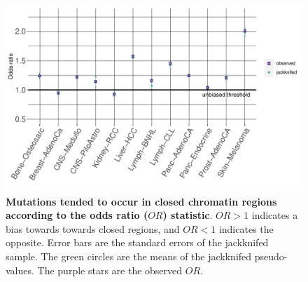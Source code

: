 \begin{figure}[ht!]
    \centering
    \includegraphics[scale=0.75]{graphics/jackknife_OR.pdf}
    \caption{\textbf{Mutations tended to occur in closed chromatin regions according to the odds ratio ($OR$) statistic}. $OR>1$ indicates a bias towards towards closed regions, and $OR<1$ indicates the opposite. Error bars are the standard errors of the jackknifed sample. The green circles are the means of the jackknifed pseudo-values. The purple stars are the observed $OR$.}
    \label{fig:or_jackknifed}
\end{figure}
